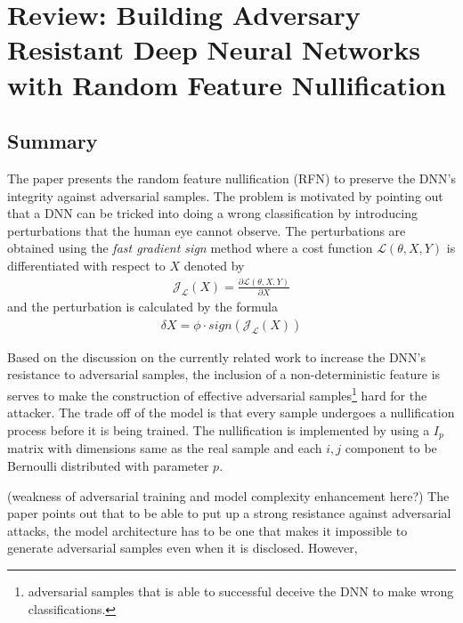 \documentclass[a4paper,10pt]{article}
\theoremstyle{definition}
\begin{document}
\section*{Review: Building Adversary Resistant Deep Neural Networks with Random Feature Nullification}
\subsection*{Summary}
The paper presents the random feature nullification (RFN) to preserve the DNN's integrity against adversarial samples. The problem is motivated by pointing out that a DNN can be tricked into doing a wrong classification by introducing perturbations that the human eye cannot observe. The perturbations are obtained using the \emph{fast gradient sign} method \cite{goodfellow2014explaining} where a cost function $\mathcal{L}(\theta,X,Y)$ is differentiated with respect to $X$ denoted by
\begin{align*}
\mathcal{J}_{\mathcal{L}}(X)=\frac{\partial \mathcal{L}(\theta,X,Y)}{\partial X}
\end{align*}
and the perturbation is calculated by the formula
\begin{align*}
\delta X = \phi \cdot sign(\mathcal{J}_{\mathcal{L}}(X))
\end{align*}


Based on the discussion on the currently related work to increase the DNN's resistance to adversarial samples, the inclusion of a non-deterministic feature is serves to make the construction of effective adversarial samples\footnote{adversarial samples that is able to successful deceive the DNN to make wrong classifications.} hard for the attacker. The trade off of the model is that every sample undergoes a nullification process before it is being trained. The nullification  is implemented by using a $I_p$ matrix with dimensions same as the real sample and each $i,j$ component to be Bernoulli distributed with parameter $p$. 


(weakness of adversarial training and model complexity enhancement here?) The paper points out that to be able to put up a strong resistance against adversarial attacks, the model architecture has to be one that makes it impossible to generate adversarial samples even when it is disclosed. However, \cite{goodfellow2014explaining} 
\end{document}
